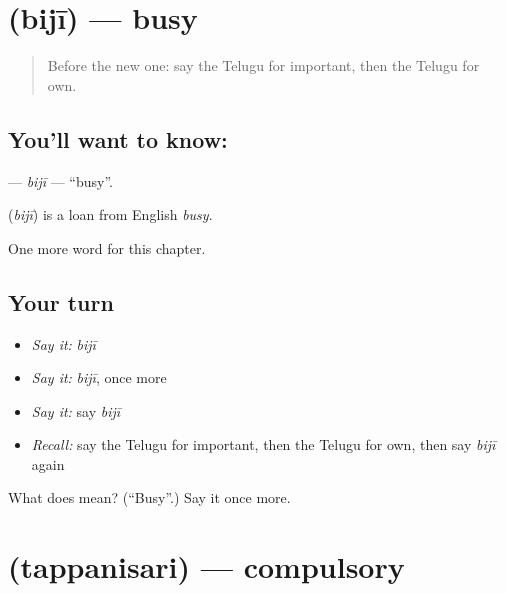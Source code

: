 \section[\texorpdfstring{\te{బిజీ} (bijī)}{బిజీ (bijī)}]{ (bijī) — busy}

\label{lesson:TE-C259-biji}



\begin{quote}
Before the new one: say the Telugu for important, then the Telugu for own.
\end{quote}

\subsection*{You'll want to know: }
\textbf{} — \emph{bijī} — \textquotedblleft{}busy\textquotedblright{}.

\begin{cousinweb}
\textbf{} (\emph{bijī}) is a loan from English \emph{busy}.
\end{cousinweb}

\begin{grammarlens}[title={What you've built}]
One more word for this chapter.
\end{grammarlens}

\subsection*{Your turn}
\begin{itemize}
\raggedright
  \item \emph{Say it:} \emph{bijī}
  \item \emph{Say it:} \emph{bijī}, once more
  \item \emph{Say it:} say \emph{bijī}
  \item \emph{Recall:} say the Telugu for important, then the Telugu for own, then say \emph{bijī} again
\end{itemize}

\begin{tcolorbox}[breakable,colback=teal!4,colframe=teal!35!black,title={Before you move on}]
What does  mean? (\textquotedblleft{}Busy\textquotedblright{}.) Say it once more.
\end{tcolorbox}
\section[\texorpdfstring{\te{తప్పనిసరి} (tappanisari)}{తప్పనిసరి (tappanisari)}]{ (tappanisari) — compulsory}

